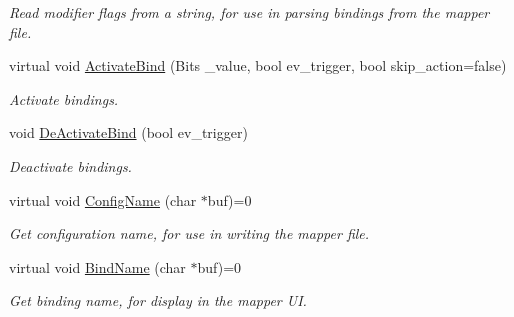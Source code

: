 \begin{DoxyCompactItemize}
\begin{DoxyCompactList}\small\item\em Read modifier flags from a string, for use in parsing bindings from the mapper file. \end{DoxyCompactList}\item 
\hypertarget{classCBind_a5df3eeb06c5b662c47a8fa3e104fe6dd}{virtual void \hyperlink{classCBind_a5df3eeb06c5b662c47a8fa3e104fe6dd}{Activate\-Bind} (Bits \-\_\-value, bool ev\-\_\-trigger, bool skip\-\_\-action=false)}\label{classCBind_a5df3eeb06c5b662c47a8fa3e104fe6dd}

\begin{DoxyCompactList}\small\item\em Activate bindings. \end{DoxyCompactList}\item 
\hypertarget{classCBind_a5fcbf42fb58070fd1a81bf892dc73e1c}{void \hyperlink{classCBind_a5fcbf42fb58070fd1a81bf892dc73e1c}{De\-Activate\-Bind} (bool ev\-\_\-trigger)}\label{classCBind_a5fcbf42fb58070fd1a81bf892dc73e1c}

\begin{DoxyCompactList}\small\item\em Deactivate bindings. \end{DoxyCompactList}\item 
\hypertarget{classCBind_a231fb0c4cc20ee05607f1e11b8b1189f}{virtual void \hyperlink{classCBind_a231fb0c4cc20ee05607f1e11b8b1189f}{Config\-Name} (char $\ast$buf)=0}\label{classCBind_a231fb0c4cc20ee05607f1e11b8b1189f}

\begin{DoxyCompactList}\small\item\em Get configuration name, for use in writing the mapper file. \end{DoxyCompactList}\item 
\hypertarget{classCBind_aa9f00238cab696c93603043ca48d456e}{virtual void \hyperlink{classCBind_aa9f00238cab696c93603043ca48d456e}{Bind\-Name} (char $\ast$buf)=0}\label{classCBind_aa9f00238cab696c93603043ca48d456e}

\begin{DoxyCompactList}\small\item\em Get binding name, for display in the mapper U\-I. \end{DoxyCompactList}\end{DoxyCompactItemize}
